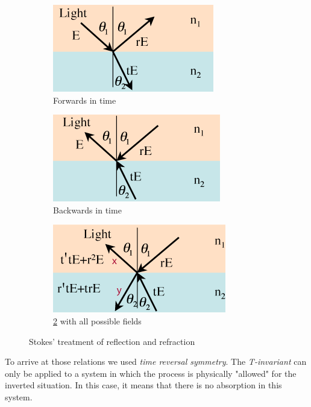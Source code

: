 \begin{figure}[ht]
    \centering
    \begin{subfigure}[b]{0.3\textwidth}
        \centering
        \includegraphics[width = \textwidth]{Bilder/Grundlagen/StokeRelat1.png}
        \caption{Forwards in time}
        \label{fig:Stokfor}
    \end{subfigure}
    \hfill
    \begin{subfigure}[b]{0.3\textwidth}
        \centering
        \includegraphics[width=\textwidth]{Bilder/Grundlagen/StokeRelat2.png}
        \caption{Backwards in time}
        \label{fig:Stockback}
    \end{subfigure}
    \hfill
    \begin{subfigure}[b]{0.3\textwidth}
        \centering
        \includegraphics[width=\textwidth]{Bilder/Grundlagen/StokeRelat3.png}
        \caption{\ref{fig:Stockback} with all possible fields}
        \label{fig:five over x}
    \end{subfigure}
       \caption{Stokes' treatment of reflection and refraction}
       \label{fig:Stokrel}
\end{figure}

To arrive at those relations we used \textit{time reversal symmetry}. The \textit{T-invariant} can only be applied to a system in which the process is physically "allowed"
for the inverted situation. In this case, it means that there is no absorption in this system.